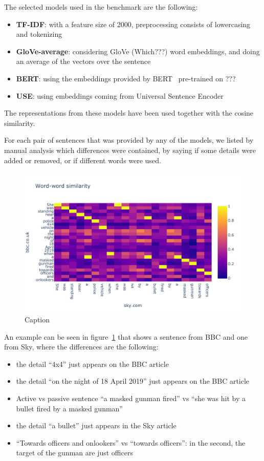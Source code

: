 The selected models used in the benchmark are the following:
\begin{itemize}
    \item \textbf{TF-IDF}: with a feature size of 2000, preprocessing consists of lowercasing and tokenizing
    \item \textbf{GloVe-average}: considering GloVe (Which???) word embeddings, and doing an average of the vectors over the sentence
    \item \textbf{BERT}: using the embeddings provided by BERT~\cite{devlin2018bert} pre-trained on ???
    \item \textbf{USE}: using embeddings coming from Universal Sentence Encoder~\cite{cer2018universal}
\end{itemize}
The representations from these models have been used together with the cosine similarity.

For each pair of sentences that was provided by any of the models, we listed by manual analysis which differences were contained, by saying if some details were added or removed, or if different words were used.


\begin{figure}[!htb]
    \centering
    \includegraphics[width=\linewidth]{figures/lyra.pdf}
    \caption{Caption}
    \label{fig:lyra}
\end{figure}

An example can be seen in figure~\ref{fig:lyra} that shows a sentence from BBC and one from Sky, where the differences are the following:

\begin{itemize}
    \item the detail ``4x4'' just appears on the BBC article
    \item the detail ``on the night of 18 April 2019'' just appears on the BBC article
    \item Active vs passive sentence ``a masked gunman fired'' vs ``she was hit by a bullet fired by a masked gunman''
    \item the detail ``a bullet'' just appears in the Sky article
    \item ``Towards officers and onlookers'' vs ``towards officers'': in the second, the target of the gunman are just officers
\end{itemize}

